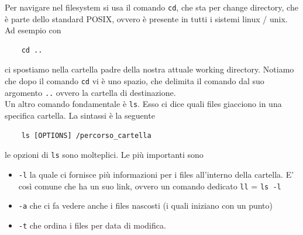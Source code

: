Per navigare nel filesystem si usa il comando \verb"cd", che sta per change directory, che è parte dello standard POSIX, ovvero è presente in tutti i sistemi linux / unix. Ad esempio con 
\begin{verbatim}
	cd ..
\end{verbatim}
ci spostiamo nella cartella padre della nostra attuale working directory. Notiamo che dopo il comando \verb"cd" vi è uno spazio, che delimita il comando dal suo argomento \verb".." ovvero la cartella di destinazione.\\
Un altro comando fondamentale è \verb"ls". Esso ci dice quali files giacciono in una specifica cartella. La sintassi è la seguente
\begin{verbatim}
	ls [OPTIONS] /percorso_cartella
\end{verbatim}
le opzioni di \verb"ls" sono molteplici. Le più importanti sono
\begin{itemize}
	\item \verb"-l" la quale ci fornisce più informazioni per i files all'interno della cartella. E' così comune che ha un suo link, ovvero un comando dedicato \verb"ll" = \verb"ls -l"
	\item \verb"-a" che ci fa vedere anche i files nascosti (i quali iniziano con un punto)
	\item \verb"-t" che ordina i files per data di modifica.
\end{itemize}


